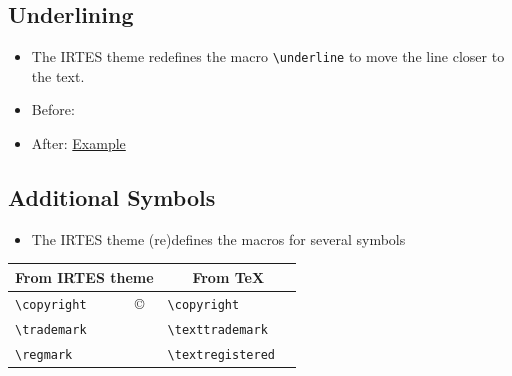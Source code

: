 \documentclass[english,circlenumberstyle]{irtesbeamer}
\begin{document}
\subsection{Underlining}

\makeatletter
\begin{frame}{\subsecname}
	\begin{itemize}
	\item The IRTES theme redefines the macro \texttt{{\textbackslash}underline} to move the line closer to the text.
	\item Before: 
	\item After: \underline{Example}
	\end{itemize}
\end{frame}
\makeatother

\subsection{Additional Symbols}
\begin{frame}{\subsecname}
	\begin{itemize}
	\item The IRTES theme (re)defines the macros for several symbols
	\end{itemize}
	\begin{tabularx}{\linewidth}{|l|X|l|X|}
	\hline
	\multicolumn{2}{|c|}{\textbf{From IRTES theme}} & \multicolumn{2}{c|}{\textbf{From \TeX}} \\
	\hline
	\texttt{{\textbackslash}copyright} & \copyright & \texttt{{\textbackslash}copyright} & \textcopyright \\
	\hline
	\texttt{{\textbackslash}trademark} & \trademark & \texttt{{\textbackslash}texttrademark} & \texttrademark \\
	\hline
	\texttt{{\textbackslash}regmark} & \regmark & \texttt{{\textbackslash}textregistered} & \textregistered \\
	\hline
	\end{tabularx}
\end{frame}
\end{document}
